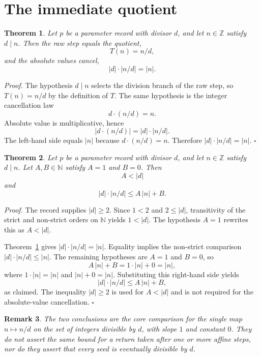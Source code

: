 \documentclass[11pt,letterpaper]{article}
\newcommand{\N}{\mathbb{N}}
\newcommand{\Z}{\mathbb{Z}}
\newtheorem{theorem}{Theorem}
\newtheorem{remark}[theorem]{Remark}
\newenvironment{proof}{\noindent\textit{Proof.}}{\hfill\(\square\)}
\begin{document}
\section{The immediate quotient}

\begin{theorem}
\label{thm:immediate-quotient}
Let \(p\) be a parameter record with divisor \(d\), and let \(n\in\Z\) satisfy
\(d\mid n\). Then the raw step equals the quotient,
\[
T(n)=n/d,
\]
and the absolute values cancel,
\[
|d|\cdot |n/d|=|n|.
\]
\end{theorem}

\begin{proof}
The hypothesis \(d\mid n\) selects the division branch of the raw step, so
\(T(n)=n/d\) by the definition of \(T\). The same hypothesis is the integer
cancellation law
\[
d\cdot(n/d)=n.
\]
Absolute value is multiplicative, hence
\[
|d\cdot(n/d)|=|d|\cdot|n/d|.
\]
The left-hand side equals \(|n|\) because \(d\cdot(n/d)=n\). Therefore
\(|d|\cdot|n/d|=|n|\).
\end{proof}

\begin{theorem}
\label{thm:immediate-core}
Let \(p\) be a parameter record with divisor \(d\), and let \(n\in\Z\) satisfy
\(d\mid n\). Let \(A,B\in\N\) satisfy \(A=1\) and \(B=0\). Then
\[
A<|d|
\]
and
\[
|d|\cdot|n/d|\le A\,|n|+B.
\]
\end{theorem}

\begin{proof}
The record supplies \(|d|\ge 2\). Since \(1<2\) and \(2\le|d|\), transitivity
of the strict and non-strict orders on \(\N\) yields \(1<|d|\). The hypothesis
\(A=1\) rewrites this as \(A<|d|\).

Theorem~\ref{thm:immediate-quotient} gives \(|d|\cdot|n/d|=|n|\). Equality
implies the non-strict comparison \(|d|\cdot|n/d|\le|n|\). The remaining
hypotheses are \(A=1\) and \(B=0\), so
\[
A\,|n|+B=1\cdot|n|+0=|n|,
\]
where \(1\cdot|n|=|n|\) and \(|n|+0=|n|\). Substituting this right-hand side
yields
\[
|d|\cdot|n/d|\le A\,|n|+B,
\]
as claimed. The inequality \(|d|\ge 2\) is used for \(A<|d|\) and is not
required for the absolute-value cancellation.
\end{proof}

\begin{remark}
The two conclusions are the core comparison for the single map \(n\mapsto n/d\)
on the set of integers divisible by \(d\), with slope \(1\) and constant \(0\).
They do not assert the same bound for a return taken after one or more affine
steps, nor do they assert that every seed is eventually divisible by \(d\).
\end{remark}
\end{document}
